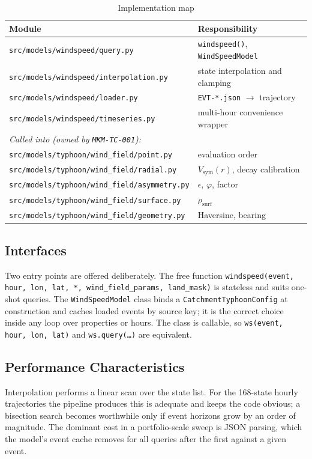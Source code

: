 \documentclass[11pt,a4paper]{article}
\begin{document}
\begin{table}[H]
  \centering
  \caption{Implementation map}
  \begin{tabular}{ll}
    \toprule
    \textbf{Module} & \textbf{Responsibility} \\
    \midrule
    \texttt{src/models/windspeed/query.py} & \texttt{windspeed()}, \texttt{WindSpeedModel} \\
    \texttt{src/models/windspeed/interpolation.py} & state interpolation and clamping \\
    \texttt{src/models/windspeed/loader.py} & \texttt{EVT-*.json} $\rightarrow$ trajectory \\
    \texttt{src/models/windspeed/timeseries.py} & multi-hour convenience wrapper \\
    \midrule
    \multicolumn{2}{l}{\emph{Called into (owned by \texttt{MKM-TC-001}):}} \\
    \texttt{src/models/typhoon/wind\_field/point.py} & evaluation order \\
    \texttt{src/models/typhoon/wind\_field/radial.py} & $V_{\text{sym}}(r)$, decay calibration \\
    \texttt{src/models/typhoon/wind\_field/asymmetry.py} & $\epsilon$, $\varphi$, factor \\
    \texttt{src/models/typhoon/wind\_field/surface.py} & $\rho_{\text{surf}}$ \\
    \texttt{src/models/typhoon/wind\_field/geometry.py} & Haversine, bearing \\
    \bottomrule
  \end{tabular}
\end{table}

\subsection{Interfaces}
Two entry points are offered deliberately. The free function
\texttt{windspeed(event, hour, lon, lat, *, wind\_field\_params, land\_mask)} is
stateless and suits one-shot queries. The \texttt{WindSpeedModel} class binds a
\texttt{CatchmentTyphoonConfig} at construction and caches loaded events by
source key; it is the correct choice inside any loop over properties or hours.
The class is callable, so \texttt{ws(event, hour, lon, lat)} and
\texttt{ws.query(\dots)} are equivalent.

\subsection{Performance Characteristics}
Interpolation performs a linear scan over the state list. For the 168-state
hourly trajectories the pipeline produces this is adequate and keeps the code
obvious; a bisection search becomes worthwhile only if event horizons grow by an
order of magnitude. The dominant cost in a portfolio-scale sweep is JSON
parsing, which the model's event cache removes for all queries after the first
against a given event.
\end{document}
